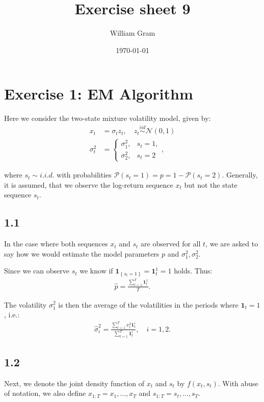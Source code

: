 \documentclass[11pt,a4paper,oneside]{article}
\title{Exercise sheet 9}
\author{William Gram}
\date{\today}
\newcommand{\lp}{\left(}
\newcommand{\rp}{\right)}
\newcommand{\lc}{\left\{}
\newcommand{\rc}{\right\}}
\newcommand{\pp}{\mathcal{P}}
\newcommand{\nnn}{\mathcal{N}}
\newcommand{\ii}{\mathbf{1}}
\newcommand{\iid}{\overset{iid}{\sim}}
\newcommand{\sumt}{\sum_{t=1}^T}
\begin{document}
\maketitle

\rfoot{\thepage}

\section{Exercise 1: EM Algorithm}
\renewcommand{\theequation}{1.\arabic{equation}}
\setcounter{equation}{0}

Here we consider the two-state mixture volatility model, given by:
\begin{align*}
    x_t 
        &= \sigma_t z_t, \quad z_t \iid \nnn\lp 0, 1\rp \\
    \sigma_t^2
        &= \begin{cases}
                \sigma_1^2, & s_t = 1,\\
                \sigma_2^2, & s_t = 2
            \end{cases},
\end{align*}

where $s_t \sim i.i.d.$ with probabilities $\pp\lp s_t = 1\rp = p = 1 - \pp\lp s_t = 2\rp$. Generally, it is assumed, that we observe the log-return sequence $x_t$ but not the state sequence $s_t$.

\subsection{1.1}
In the case where both sequences $x_t$ and $s_t$ are observed for all $t$, we are asked to say how we would estimate the model parameters $p$ and $\sigma_1^2, \sigma_2^2$.

Since we can observe $s_t$ we know if $\ii_{\lc s_t = 1\rc} = \ii_t^1 = 1$ holds. Thus:
\begin{align}
    \hat p = \frac{\sumt \ii_t^1}{T}.
\end{align}

The volatility $\sigma_1^2$ is then the average of the volatilities in the periods where $\ii_t = 1$, i.e.:
\begin{align}
    \hat \sigma_i^2 = \frac{\sumt x_t^2 \ii_t^i}{\sumt \ii_t^i}, \quad i = 1, 2.
\end{align}

\subsection{1.2}
Next, we denote the joint density function of $x_t$ and $s_t$ by $f\lp x_t, s_t\rp$. With abuse of notation, we also define $x_{1:T} = x_1, \dots, x_T$ and $s_{1:T} = s_t, \dots, s_T$.
\end{document}

